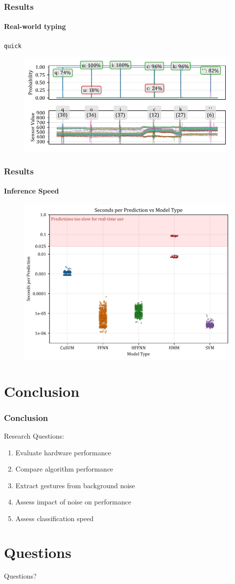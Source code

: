 \documentclass[xcolor={svgnames,table},10pt,fleqn]{beamer}
\begin{document}
\begin{frame}
    \frametitle{Results}
    \framesubtitle{Real-world typing}
    \centering
    \texttt{quick }
    \begin{figure}[h]
        \centering
        \includegraphics[width=\textwidth]{imgs/05_pred_plot_0900_to_1800_quick.pdf}
    \end{figure}
\end{frame}

\begin{frame}
    \frametitle{Results}
    \framesubtitle{Inference Speed}
    \begin{figure}[h]
        \centering
        \includegraphics[width=\textwidth]{imgs/inference_time_per_obs_per_model.pdf}
    \end{figure}
\end{frame}

\section{Conclusion}
\begin{frame}
    \frametitle{Conclusion}
    Research Questions:
    \begin{enumerate}
        \item Evaluate hardware performance
        \item Compare algorithm performance
        \item Extract gestures from background noise
        \item Assess impact of noise on performance
        \item Assess classification speed
    \end{enumerate}
\end{frame}

\section{Questions}
\begin{frame}
    \centering
    Questions?
\end{frame}
\end{document}
